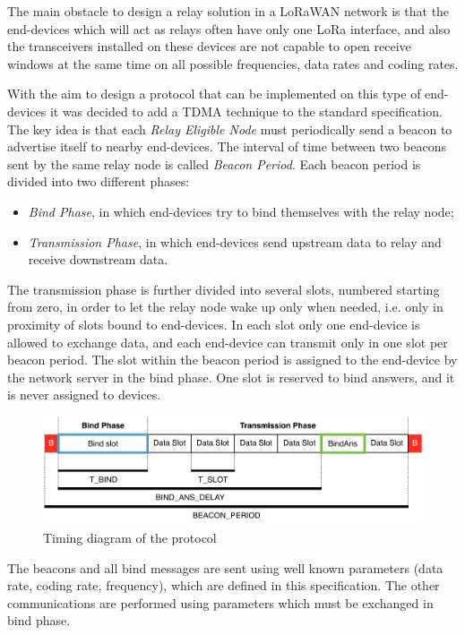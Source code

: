 The main obstacle to design a relay solution in a LoRaWAN network is that the end-devices which will act as relays often have only one LoRa interface, and also the transceivers installed on these devices are not capable to open receive windows at the same time on all possible frequencies, data rates and coding rates.

With the aim to design a protocol that can be implemented on this type of end-devices it was decided to add a TDMA technique to the standard specification. The key idea is that each \emph{Relay Eligible Node} must periodically send a beacon to advertise itself to nearby end-devices. The interval of time between two beacons sent by the same relay node is called \emph{Beacon Period}. Each beacon period is divided into two different phases:

\begin{itemize}

\item \emph{Bind Phase}, in which end-devices try to bind themselves with the relay node;

\item \emph{Transmission Phase}, in which end-devices send upstream data to relay and receive downstream data.

\end{itemize}
The transmission phase is further divided into several slots, numbered starting from zero, in order to let the relay node wake up only when needed, i.e. only in proximity of slots bound to end-devices.
In each slot only one end-device is allowed to exchange data, and each end-device can transmit only in one slot per beacon period. The slot within the beacon period is assigned to the end-device by the network server in the bind phase. One slot is reserved to bind answers, and it is never assigned to devices.

\begin{figure}
\centering
\includegraphics[width=\textwidth]{img/timing_diagram}
\caption{Timing diagram of the protocol}
\label{fig:timepdia}
\end{figure}

The beacons and all bind messages are sent using well known parameters (data rate, coding rate, frequency), which are defined in this specification. The other communications are performed using parameters which must be exchanged in bind phase.

